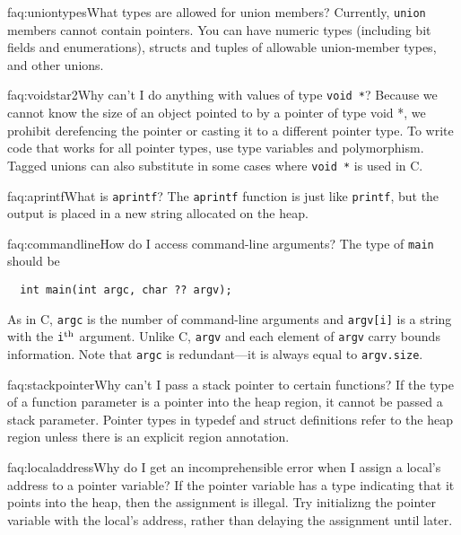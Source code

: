 \begin{faqa}{faq:uniontypes}{What types are allowed for union members?}
Currently, \texttt{union} members cannot contain pointers.  You can
have numeric types (including bit fields and enumerations), structs
and tuples of allowable union-member types, and other unions.
\end{faqa}

\begin{faqa}{faq:voidstar2}{Why can't I do anything with values of type \texttt{void *}?}
Because we cannot know the size of an object pointed to by a pointer
of type void *, we prohibit derefencing the pointer or casting it to a
different pointer type.  To write code that works for all pointer
types, use type variables and polymorphism.  Tagged unions can also
substitute in some cases where \texttt{void *} is used in C\@.
\end{faqa}

\begin{faqa}{faq:aprintf}{What is \texttt{aprintf}?}
The \texttt{aprintf} function is just like \texttt{printf}, but
the output is placed in a new string allocated on the heap.
\end{faqa}

\begin{faqa}{faq:commandline}{How do I access command-line arguments?}
The type of \texttt{main} should be
\begin{verbatim}
  int main(int argc, char ?? argv);
\end{verbatim}
As in C, \texttt{argc} is the number of command-line arguments and
\texttt{argv[i]} is a string with the \texttt{i}$^{\rm th}$ argument.
Unlike C, \texttt{argv} and each element of \texttt{argv} carry bounds
information.  Note that \texttt{argc} is redundant---it is always
equal to \texttt{argv.size}.
\end{faqa}

\begin{faqa}{faq:stackpointer}{Why can't I pass a stack pointer to certain functions?}
If the type of a function parameter is a pointer into the heap region,
it cannot be passed a stack parameter.  Pointer types in typedef and
struct definitions refer to the heap region unless there is an
explicit region annotation.
\end{faqa}

\begin{faqa}{faq:localaddress}{Why do I get an incomprehensible error when I assign a local's address to a pointer variable?}
If the pointer variable has a type indicating that it points into the
heap, then the assignment is illegal.  Try initializng the pointer variable
with the local's address, rather than delaying the assignment until later.
\end{faqa}

